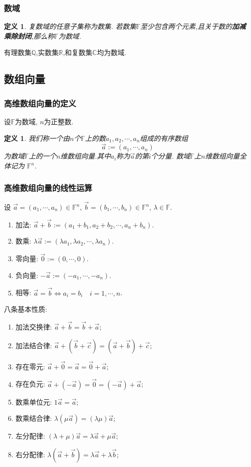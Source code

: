 \documentclass{article}
\newtheorem{definition}[theorem]{定义}
\renewcommand{\blue }[1]{{\textcolor[rgb]{0,0,1}{#1}}}
\begin{document}
\subsubsection{数域}
\begin{definition} 复数域的任意子集称为\blue{数集}. 若数集$\mathbb F$至少包含两个元素,且关于数的{\bf 加减乘除封闭},那么称$\mathbb F$为\blue{数域}.
\end{definition}
有理数集$\mathbb Q$,实数集$\mathbb R$,和复数集$\mathbb C$均为数域.


\subsection{数组向量}

\subsubsection{高维数组向量的定义}
设$\mathbb F$为数域, $n$为正整数.
\begin{definition}我们称一个由$n$个$\mathbb F$上的数$a_1,a_2,\cdots,a_n$组成的有序数组
\[\vec{a} := (a_1,\cdots,a_n)\]
为\blue{数域$\mathbb F$上的一个$n$维数组向量}.其中$a_i$称为$\vec{a}$的\blue{第$i$个分量}. 数域$\mathbb F$上$n$维数组向量全体记为 \blue{$\mathbb F^n$}.
\end{definition}


\subsubsection{高维数组向量的线性运算}
设 $\vec{a}=(a_1,\cdots,a_n)\in \mathbb F^n$, $\vec{b}=(b_1,\cdots,b_n)\in \mathbb F^n$, $\lambda\in \mathbb F$.
\begin{enumerate}
\item 加法: $\vec{a}+\vec{b}:=(a_1+b_1,a_2+b_2,\cdots,a_n+b_n)$.
\item 数乘: $\lambda \vec{a}:=(\lambda a_1,\lambda a_2,\cdots,\lambda a_n)$.
\item 零向量: $\vec{0}:=(0,\cdots,0)$.
\item 负向量: $-\vec{a}:=(-a_1,\cdots,-a_n)$.
\item 相等: $\vec{a}=\vec{b} \iff a_i=b_i \quad i=1,\cdots,n$.
\end{enumerate}
\blue{八条基本性质:}
\begin{enumerate}
\item 加法交换律: $\vec{a}+\vec{b}=\vec{b}+\vec{a}$;
\item 加法结合律: $\vec{a}+(\vec{b}+\vec{c})=(\vec{a}+\vec{b})+\vec{c}$;
\item 存在零元: $\vec{a}+\vec{0}=\vec{a}=\vec{0}+\vec{a}$;
\item 存在负元: $\vec{a}+(-\vec{a})=\vec{0}=(-\vec{a})+\vec{a}$;
\item 数乘单位元: $1\vec{a} = \vec{a}$;
\item 数乘结合律: $\lambda(\mu \vec{a})=(\lambda \mu)\vec{a}$;
\item 左分配律: $(\lambda+\mu)\vec{a}=\lambda \vec{a} + \mu \vec{a}$;
\item 右分配律: $\lambda (\vec{a}+\vec{b}) =\lambda \vec{a} + \lambda \vec{b}$;
\end{enumerate}
\end{document}
